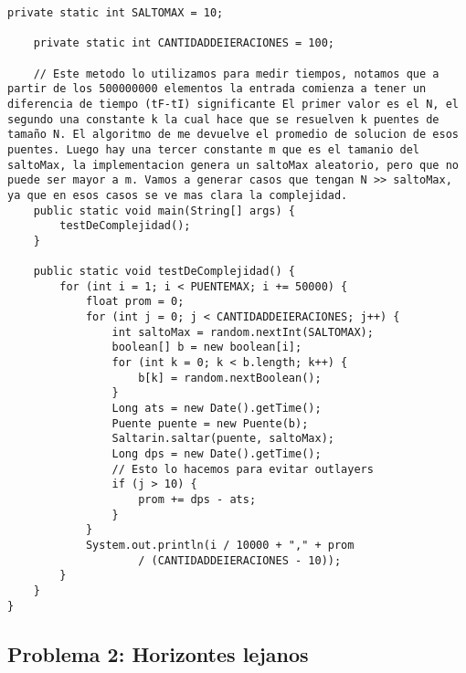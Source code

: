 \begin{lstlisting}[frame=single]
    private static int SALTOMAX = 10;

    private static int CANTIDADDEIERACIONES = 100;

    // Este metodo lo utilizamos para medir tiempos, notamos que a partir de los 500000000 elementos la entrada comienza a tener un diferencia de tiempo (tF-tI) significante El primer valor es el N, el segundo una constante k la cual hace que se resuelven k puentes de tamaño N. El algoritmo de me devuelve el promedio de solucion de esos puentes. Luego hay una tercer constante m que es el tamanio del saltoMax, la implementacion genera un saltoMax aleatorio, pero que no puede ser mayor a m. Vamos a generar casos que tengan N >> saltoMax, ya que en esos casos se ve mas clara la complejidad.
    public static void main(String[] args) {
        testDeComplejidad();
    }

    public static void testDeComplejidad() {
        for (int i = 1; i < PUENTEMAX; i += 50000) {
            float prom = 0;
            for (int j = 0; j < CANTIDADDEIERACIONES; j++) {
                int saltoMax = random.nextInt(SALTOMAX);
                boolean[] b = new boolean[i];
                for (int k = 0; k < b.length; k++) {
                    b[k] = random.nextBoolean();
                }
                Long ats = new Date().getTime();
                Puente puente = new Puente(b);
                Saltarin.saltar(puente, saltoMax);
                Long dps = new Date().getTime();
                // Esto lo hacemos para evitar outlayers
                if (j > 10) {
                    prom += dps - ats;
                }
            }
            System.out.println(i / 10000 + "," + prom
                    / (CANTIDADDEIERACIONES - 10));
        }
    }
}
\end{lstlisting}

\subsection{Problema 2: Horizontes lejanos}


